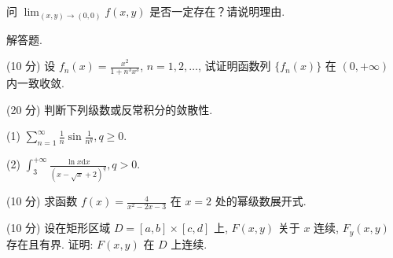 \nopagebreak[4]
问 $\lim_{(x,y)\to (0,0)}f(x,y)$ 是否一定存在？请说明理由.\par
\par{}
解答题.\par
(10 分) 设 $f_{n}(x) = \frac{x^{2}}{1 + n^{3}x^{3}}$, $n = 1,2,\dots$, 试证明函数列 $\{f_{n}(x)\}$ 在 $(0, +\infty)$ 内一致收敛.\par
(20 分) 判断下列级数或反常积分的敛散性.\par
(1) $\sum_{n=1}^{\infty} \frac{1}{n} \sin \frac{1}{n^q}, q \geq 0.$\par
(2) $\int_{3}^{+\infty}\frac{\ln x\mathrm{d}x}{(x - \sqrt{x} + 2)^q},q > 0.$\par
(10 分) 求函数 $f(x) = \frac{4}{x^2 - 2x - 3}$ 在 $x = 2$ 处的幂级数展开式.\par
(10 分) 设在矩形区域 $D = [a, b] \times [c, d]$ 上, $F(x, y)$ 关于 $x$ 连续, $F_y(x, y)$ 存在且有界. 证明: $F(x, y)$ 在 $D$ 上连续.\par
